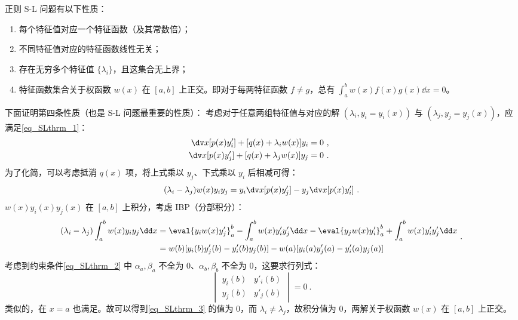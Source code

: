 正则 S-L 问题有以下性质：
\begin{enumerate}
\item 每个特征值对应一个特征函数（及其常数倍）；
\item 不同特征值对应的特征函数线性无关；
\item 存在无穷多个特征值 $\{\lambda_i\}$，且这集合无上界；
\item 特征函数集合关于权函数 $w(x)$ 在 $[a,b]$ 上正交。即对于每两特征函数 $f \neq g$，总有 $\int_a^b w(x)f(x)g(x) \dd x = 0$。 
\end{enumerate}
下面证明第四条性质（也是 S-L 问题最重要的性质）：
考虑对于任意两组特征值与对应的解 $(\lambda_i, y_i=y_i(x))$ 与 $(\lambda_j, y_j=y_j(x))$，应满足\autoref{eq_SLthrm_1}：
\begin{equation}
\begin{aligned}
\dv x [p(x) y'_i] + [q(x) + \lambda_i w(x)] y_i &= 0 ~,\\
\dv x [p(x) y'_j] + [q(x) + \lambda_j w(x)] y_j &= 0 ~.
\end{aligned} ~~
\end{equation}
为了化简，可以考虑抵消 $q(x)$ 项，将上式乘以 $y_j$、下式乘以 $y_i$ 后相减可得：
\begin{equation}
(\lambda_i - \lambda_j)w(x) y_i y_j = y_i \dv x [p(x) y'_j] - y_j \dv x [p(x) y'_i] ~.
\end{equation}
$w(x)y_i(x) y_j(x)$ 在 $[a, b]$ 上积分，考虑 IBP（分部积分）：
\begin{equation}\label{eq_SLthrm_3}
\begin{aligned}
(\lambda_i - \lambda_j) \int_a^b w(x) y_i y_j \dd x &= \eval{y_i w(x) y'_j}_a^b - \int_a^b w(x) y'_i y'_j \dd x - \eval{y_j w(x) y'_i}_a^b + \int_a^b w(x) y'_i y'_j \dd x\\
&= w(b) [y_i(b) y'_j(b) - y'_i(b) y_j(b)] - w(a) [y_i(a) y'_j(a) - y'_i(a) y_j(a)] 
\end{aligned} ~.
\end{equation}
考虑到约束条件\autoref{eq_SLthrm_2} 中 $\alpha_a, \beta_a$ 不全为 $0$、$\alpha_b, \beta_b$ 不全为 $0$，这要求行列式：
\begin{equation}
\begin{vmatrix}
y_i(b) & y'_i(b) \\
y_j(b) & y'_j(b)
\end{vmatrix} = 0~.
\end{equation}
类似的，在 $x=a$ 也满足。故可以得到\autoref{eq_SLthrm_3} 的值为 $0$，而 $\lambda_i \neq \lambda_j$，故积分值为 $0$，两解关于权函数 $w(x)$ 在 $[a, b]$ 上正交。


